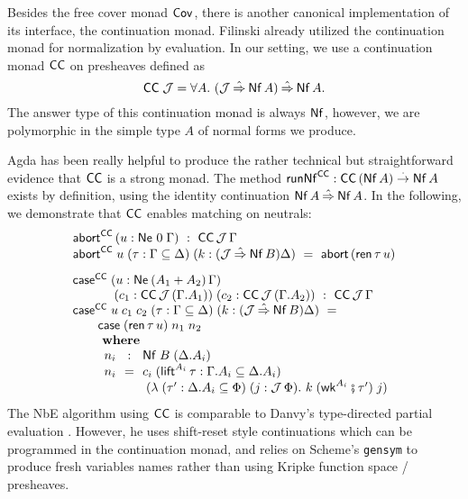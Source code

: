 \documentclass[sigplan,screen,fleqn]{acmart}
\begin{document}
Besides the free cover monad $\Cov$, there is another canonical
implementation of its interface, the continuation monad.
Filinski
\cite[Section~5.4]{filinski:semaccounttdpe}
\cite[Section~3.2]{filinski:tlca01}
already utilized the continuation monad for
normalization by evaluation.
In our setting, we use a continuation monad $\CC$ on presheaves
defined as
\[
  \CC\;\J = \forall A.\ (\J \hatto \tNf\,A) \hatto \tNf\,A
  .
\]
The answer type of this continuation monad is always $\tNf$, however,
we are polymorphic in the simple type $A$ of normal forms we produce.%

Agda has been really helpful to produce the rather technical but
straightforward evidence that $\CC$ is a strong monad.
The method $\trunNf[\CC] : \CC\,(\tNf\,A) \todot \tNf\,A$
exists by definition, using the identity continuation $\tNf\,A \hatto \tNf\,A$.
In the following, we demonstrate that $\CC$
enables matching on neutrals:
\[
\begin{array}{l}
  \tabort^{\CC} \, (u : \Ne \tyzero \Gamma) ~:~  \CC\,\J\,\Gamma \\
  \tabort^{\CC}
    \; u
    \; (\tau : \Gamma \sublist \Delta)
    \; (k : (\J \hatto \tNf\,B)\Delta)
     ~=~
    \tabort\,(\tren\,\tau\,u)
\\[2ex]
  \tcase^{\CC}
     \; (u : \NeP {A_1 + A_2} \Gamma) \\ \qquad \quad
     \; (c_1 : \CC\,\J\,(\cext \Gamma {A_1}))
     \; (c_2 : \CC\,\J\,(\cext \Gamma {A_2}))
    ~:~ \CC\,\J\,\Gamma \\
  \tcase^{\CC}
    \; u
    \; c_1
    \; c_2
    \; (\tau : \Gamma \sublist \Delta)
    \; (k : (\J \hatto \tNf\,B)\Delta)
     ~=~ \\  \qquad
    \tcase\;(\tren\,\tau\,u)\;n_1\;n_2
    \\ \qquad \bwhere \\
\qquad
  \begin{array}{l@{~~}c@{~~}l}
     n_i & : & \Nf B {(\cext \Delta {A_i})} \\
     n_i & = & c_i
      \; (\tlift^{A_i}\,\tau
            : \cext \Gamma {A_i} \sublist \cext \Delta {A_i})
\\ &&
      \; \left(\lambda
            \; (\tau' : \cext \Delta {A_i} \sublist \Phi)
            \; (j :  \J\,\Phi) .
            \ k
            \; (\twk^{A_i} \rcomp \tau')
            \; j
         \right)
  \end{array}
\end{array}
\]
The NbE algorithm using $\CC$ is comparable to Danvy's type-directed
partial evaluation \cite[Figure~8]{danvy:popl96}.  However, he uses
shift-reset style continuations which can be programmed in the
continuation monad, and relies on Scheme's \texttt{gensym} to produce
fresh variables names rather than using Kripke function space / presheaves.
\end{document}
